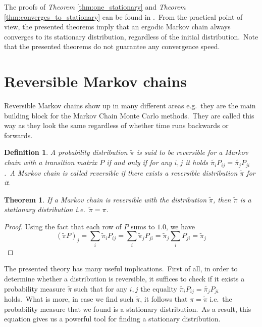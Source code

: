 \documentclass[shortabstract, english, lic]{iithesis}
\theoremstyle{default_theorem_style}\newtheorem{theorem}{Theorem}
\theoremstyle{default_theorem_style}\newtheorem{definition}{Definition}
\begin{document}
\noindent The proofs of \textit{Theorem} \ref{thm:one_stationary} and \textit{Theorem}
\ref{thm:converges_to_stationary} can be found in \cite{markov_chains_book}.\ From the practical point of view, the
presented theorems imply that an ergodic Markov chain always converges to its stationary distribution, regardless of
the initial distribution.\ Note that the presented theorems do not guarantee any convergence speed.

\section{Reversible Markov chains}

Reversible Markov chains show up in many different areas e.g.\ they are the main building block for the Markov
Chain Monte Carlo methods.\ They are called this way as they look the same regardless of whether time runs
backwards or forwards.

\begin{definition}
A probability distribution $\tilde{\pi}$ is said to be \textit{reversible} for a Markov chain with a transition
matrix $P$ if and only if for any $i,j$ it holds $\tilde{\pi_i} P_{ij} = \tilde{\pi_j} P_{ji}$.\ A Markov chain is called
reversible if there exists a reversible distribution $\tilde{\pi}$ for it.
\end{definition}

\begin{theorem}\label{reversible_chain}
If a Markov chain is reversible with the distribution $\tilde{\pi}$, then $\tilde{\pi}$ is a stationary distribution
i.e.\ $\tilde{\pi} = \pi$.
\end{theorem}

\begin{proof}
Using the fact that each row of $P$ sums to $1.0$, we have
$$
(\tilde{\pi} P)_j = \sum\limits_i \tilde{\pi}_i P_{ij} = \sum\limits_i \tilde{\pi}_j P_{ji} =
\tilde{\pi}_j \sum\limits_i P_{ji} = \tilde{\pi}_j
$$
\end{proof}

\noindent The presented theory has many useful implications.\ First of all, in order to determine
whether a distribution is reversible, it suffices to check if it exists a probability measure $\tilde{\pi}$ such that
for any $i, j$ the equality $\tilde{\pi_i} P_{ij} = \tilde{\pi_j} P_{ji}$ holds.\ What is more, in case we find such
$\tilde{\pi}$, it follows that $\pi = \tilde{\pi}$ i.e.\ the probability measure that we found is a stationary
distribution.\ As a result, this equation gives us a powerful tool for finding a stationary distribution.
\end{document}
